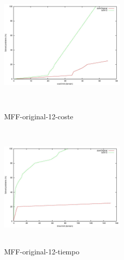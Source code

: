 \documentclass{article}
\begin{document}
\begin{figure}[!htb]
   \begin{minipage}{0.48\textwidth}
     \centering
     \includegraphics[width=6cm, height=6cm]{mff-or-12-cost}
    \caption{MFF-original-12-coste}
   \end{minipage}\hfill
   \begin {minipage}{0.48\textwidth}
     \centering
     \includegraphics[width=6cm, height=6cm]{mff-or-12-time}
    \caption{MFF-original-12-tiempo}
   \end{minipage}
\end{figure}
\end{document}
